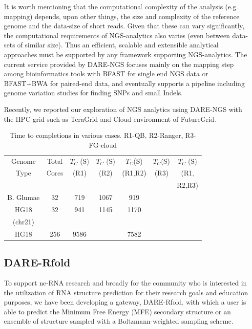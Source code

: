 \documentclass{sig-alternate}
\begin{document}
It is worth mentioning that the computational complexity
of the analysis (e.g. mapping) depends, upon other things, the size
and complexity of the reference genome and the data-size of short reads.
Given that these can vary significantly, the computational
requirements of NGS-analytics also varies (even between data-sets of
similar size).  Thus an efficient, scalable and extensible analytical
approaches must be supported by any framework supporting
NGS-analytics.  The current service provided by DARE-NGS focuses mainly on the mapping step among bioinformatics tools with BFAST for single end NGS data or BFAST+BWA for paired-end data, and eventually supports a pipeline including genome variation studies for finding SNPs and small Indels.

Recently, we reported our exploration of NGS analytics using DARE-NGS with the HPC grid such as TeraGrid and
Cloud environment of FutureGrid\cite{ecmls11}.   

 \begin{table}
 \small
 \begin{tabular}{|c|c|c|c|c|c|c|} 
 \hline 
  Genome &Total             & $T_C$ (S)          & $T_C$  (S)  & $T_{C}$(S) &  $T_C$(S) & $T_{C}$ (S)  \\
  Type          &Cores           &  (R1)                     & (R2)              &  (R1,R2)       &  (R3)        & (R1,          \\
 &  &  &  &  &  &  R2,R3) \\ \hline
 B. Glumae   &   32 &          719               &      1067             &  919                   &            &    \\
\hline
HG18    & 32  &       941                  &            1145            &     1170           &                &       \\
  (chr21)  &  &  &  &  &  & \\
\hline
 HG18    & 256  &   9586    &                   &   7582&                &      \\

\hline
\end{tabular}
\caption{  Time to completions in various cases. R1-QB, R2-Ranger, R3-FG-cloud  }
  
  \label{table:NGS-Distributed} 
\end{table}




\subsection{DARE-Rfold}
To support nc-RNA research and broadly for the community who is interested in the utilization of RNA structure prediction for their research goals and education purposes, we have been developing a gateway, DARE-Rfold, with which a user is able to predict the Minimum Free Energy (MFE) secondary structure or an ensemble of structure sampled with a Boltzmann-weighted sampling scheme.  
\end{document}
